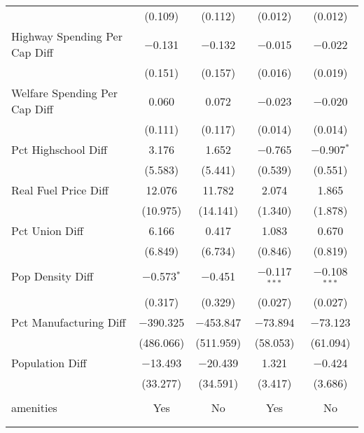 \begin{table}[!htbp]
\begin{tabular}{@{\extracolsep{5pt}}lcccc}
  & (0.109) & (0.112) & (0.012) & (0.012) \\ 
  Highway Spending Per Cap Diff & $-$0.131 & $-$0.132 & $-$0.015 & $-$0.022 \\ 
  & (0.151) & (0.157) & (0.016) & (0.019) \\ 
  Welfare Spending Per Cap Diff & 0.060 & 0.072 & $-$0.023 & $-$0.020 \\ 
  & (0.111) & (0.117) & (0.014) & (0.014) \\ 
  Pct Highschool Diff & 3.176 & 1.652 & $-$0.765 & $-$0.907$^{*}$ \\ 
  & (5.583) & (5.441) & (0.539) & (0.551) \\ 
  Real Fuel Price Diff & 12.076 & 11.782 & 2.074 & 1.865 \\ 
  & (10.975) & (14.141) & (1.340) & (1.878) \\ 
  Pct Union Diff & 6.166 & 0.417 & 1.083 & 0.670 \\ 
  & (6.849) & (6.734) & (0.846) & (0.819) \\ 
  Pop Density Diff & $-$0.573$^{*}$ & $-$0.451 & $-$0.117$^{***}$ & $-$0.108$^{***}$ \\ 
  & (0.317) & (0.329) & (0.027) & (0.027) \\ 
  Pct Manufacturing Diff & $-$390.325 & $-$453.847 & $-$73.894 & $-$73.123 \\ 
  & (486.066) & (511.959) & (58.053) & (61.094) \\ 
  Population Diff & $-$13.493 & $-$20.439 & 1.321 & $-$0.424 \\ 
  & (33.277) & (34.591) & (3.417) & (3.686) \\ 
 \hline \\[-1.8ex] 
amenities & Yes & No & Yes & No \\ 
\hline \\[-1.8ex] 
\hline 
\hline \\[-1.8ex] 
\end{tabular} 
\end{table} 
